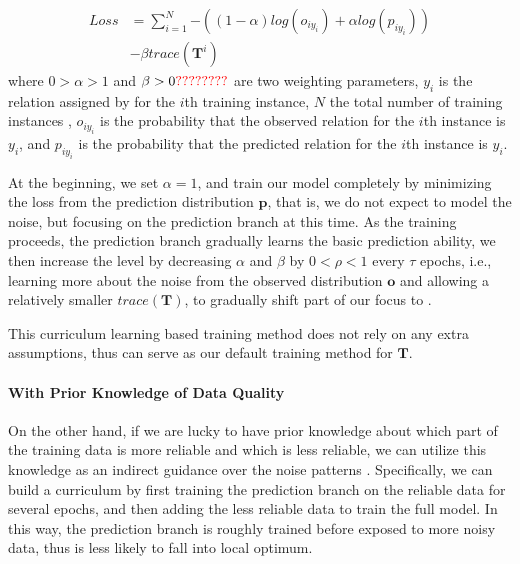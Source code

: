 %
\begin{equation}
\begin{aligned}
Loss	&=\sum_{i=1}^N{-((1-\alpha) log(o_{iy_{i}}) + \alpha log(p_{iy_{i}}))} \\
&- \beta trace(\mathbf{T}^{i})
\end{aligned}
\label{general_loss}
\end{equation}
where $0>\alpha>1$ and $\beta>0\textcolor{red}{????????}$ are two weighting parameters, $y_i$ is the relation assigned by \DS for the $i$th training instance, $N$ the total number of training instances , $o_{iy_{i}}$ is the probability that the observed relation for the $i$th instance is $y_i$, and $p_{iy_{i}}$ is the probability that the predicted relation for the $i$th instance is $y_i$.

At the beginning, we set $\alpha=1$, and train our model  completely by minimizing the loss from the prediction distribution $\mathbf{p}$,  that is, we do not expect to model the noise,  but focusing  on the prediction branch at this time. As the training proceeds, the prediction branch gradually learns the basic prediction ability, we then increase the level by decreasing $\alpha$ and  $\beta$ by $0<\rho<1$  every $\tau$ epochs, i.e., learning more about the noise from the observed distribution $\mathbf{o}$ and allowing a relatively smaller $trace(\mathbf{T})$, to gradually shift part of our focus to 
. 
%

This curriculum learning based training method does not rely on any extra assumptions, 
thus can serve as our default training method for $\mathbf{T}$.

\paragraph{With Prior Knowledge of Data Quality}
On the other hand, if we are lucky to have prior knowledge about which part of the training data is more reliable and which is less reliable, we can utilize this knowledge as an indirect guidance over the noise patterns . Specifically, we can build a curriculum by first training the prediction branch on the reliable data for several epochs, and then adding the less reliable data to train the full model. In this way, the prediction branch is roughly trained before exposed to more noisy data, thus is less likely to fall into local optimum. 


